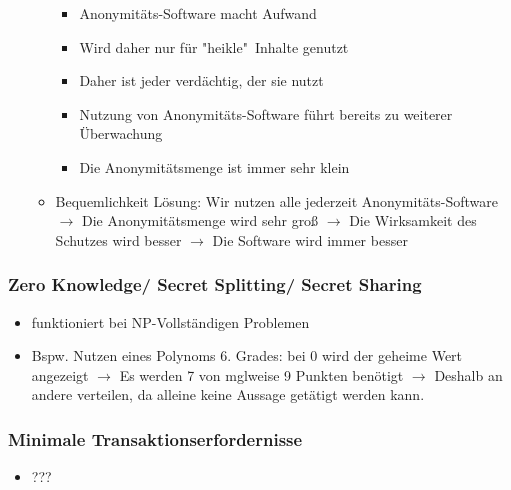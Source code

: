 \documentclass{article} %
\begin{document}
\begin{itemize}
\begin{itemize}
					\begin{itemize}
						\item Anonymitäts-Software macht Aufwand
						\item Wird daher nur für "heikle"\ Inhalte genutzt
						\item Daher ist jeder verdächtig, der sie nutzt
						\item Nutzung von Anonymitäts-Software führt bereits zu weiterer Überwachung
						\item Die Anonymitätsmenge ist immer sehr klein
					\end{itemize}
					\item Bequemlichkeit Lösung: Wir nutzen alle jederzeit Anonymitäts-Software $\rightarrow$ Die Anonymitätsmenge wird sehr groß  $\rightarrow$  Die Wirksamkeit des Schutzes wird besser $\rightarrow$ Die Software wird immer besser
				\end{itemize}
			\end{itemize}
			\subsubsection{Zero Knowledge/ Secret Splitting/ Secret Sharing}
			\begin{itemize} 
				\item funktioniert bei NP-Vollständigen Problemen
				\item Bspw. Nutzen eines Polynoms 6. Grades: bei 0 wird der geheime Wert angezeigt $\rightarrow$ Es werden 7 von mglweise 9 Punkten benötigt $\rightarrow$ Deshalb an andere verteilen, da alleine keine Aussage getätigt werden kann.
			\end{itemize}
			\subsubsection{Minimale Transaktionserfordernisse}
			\begin{itemize} 
				\item ???
			\end{itemize}
\end{document}

